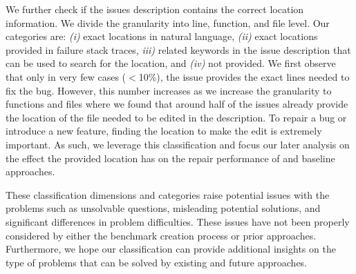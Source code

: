 We further check if the issues description contains the correct location information. 
We divide the granularity into line, function, and file level. 
Our categories are: \emph{(i)} exact locations in natural language, \emph{(ii)} exact locations provided in failure stack traces, \emph{iii)} related keywords in the issue description that can be used to search for the location, and \emph{(iv)} not provided. 
We first observe that only in very few cases ($<$10\%), the issue provides the exact lines needed to fix the bug. 
However, this number increases as we increase the granularity to functions and files where we found that around half of the issues already provide the location of the file needed to be edited in the description.
To repair a bug or introduce a new feature, finding the location to make the edit is extremely important. 
As such, we leverage this classification and focus our later analysis on the effect the provided location has on the repair performance of \tech and baseline approaches.

These classification dimensions and categories raise potential issues with the \swebenchlite problems such as unsolvable questions, misleading potential solutions, and significant differences in problem difficulties.
These issues have not been properly considered by either the benchmark creation process or prior approaches. 
Furthermore, we hope our classification can provide additional insights on the type of problems that can be solved by existing and future approaches. 


\subsection{\swebenchlitefiltered}


